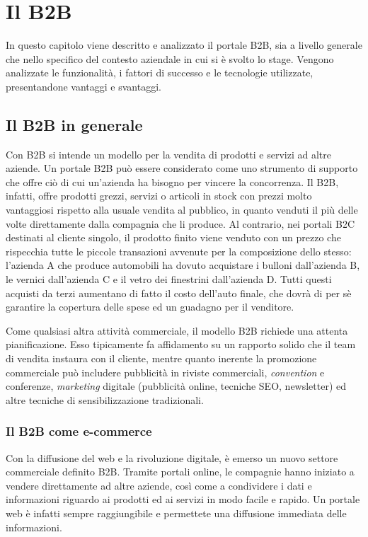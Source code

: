 \chapter{Il B2B}
\begin{flushright}
	\parbox{13cm}{\small In questo capitolo viene descritto e analizzato il portale B2B, sia a livello generale che nello specifico del contesto aziendale in cui si è svolto lo stage. Vengono analizzate le funzionalità, i fattori di successo e le tecnologie utilizzate, presentandone vantaggi e svantaggi.}
\end{flushright}
\section{Il B2B in generale}
Con B2B si intende un modello per la vendita di prodotti e servizi ad altre aziende. Un portale B2B può essere considerato come uno strumento di supporto che offre ciò di cui un'azienda ha bisogno per vincere la concorrenza. Il B2B, infatti, offre prodotti grezzi, servizi o articoli in stock con prezzi molto vantaggiosi rispetto alla usuale vendita al pubblico, in quanto venduti il più delle volte direttamente dalla compagnia che li produce. Al contrario, nei portali B2C destinati al cliente singolo, il prodotto finito viene venduto con un prezzo che rispecchia tutte le piccole transazioni avvenute per la composizione dello stesso: l'azienda A che produce automobili ha dovuto acquistare i bulloni dall'azienda B, le vernici dall'azienda C e il vetro dei finestrini dall'azienda D. Tutti questi acquisti da terzi aumentano di fatto il costo dell'auto finale, che dovrà di per sè garantire la copertura delle spese ed un guadagno per il venditore.

Come qualsiasi altra attività commerciale, il modello B2B richiede una attenta pianificazione. Esso tipicamente fa affidamento su un rapporto solido che il team di vendita instaura con il cliente, mentre quanto inerente la promozione commerciale può includere pubblicità in riviste commerciali, \textit{convention} e conferenze, \textit{marketing} digitale (pubblicità online, tecniche SEO, newsletter) ed altre tecniche di sensibilizzazione tradizionali.

\subsection{Il B2B come e-commerce}
Con la diffusione del web e la rivoluzione digitale, è emerso un nuovo settore commerciale definito B2B. Tramite portali online, le compagnie hanno iniziato a vendere direttamente ad altre aziende, così come a condividere i dati e informazioni riguardo ai prodotti ed ai servizi in modo facile e rapido. Un portale web è infatti sempre raggiungibile e permettete una diffusione immediata delle informazioni.

